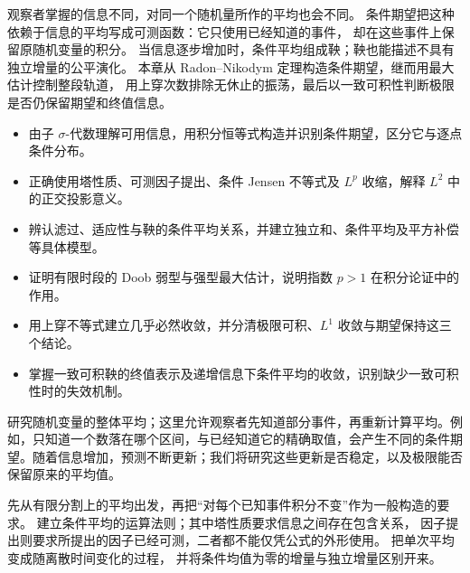 
\begin{chapterabstract}
观察者掌握的信息不同，对同一个随机量所作的平均也会不同。
条件期望把这种依赖于信息的平均写成可测函数：它只使用已经知道的事件，
却在这些事件上保留原随机变量的积分。
当信息逐步增加时，条件平均组成鞅；鞅也能描述不具有独立增量的公平演化。
本章从 Radon--Nikodym 定理构造条件期望，继而用最大估计控制整段轨道，
用上穿次数排除无休止的振荡，最后以一致可积性判断极限是否仍保留期望和终值信息。
\end{chapterabstract}

\begin{learninggoals}
\begin{itemize}
\item\label{b1:item:31-goal-construction}由子 \(\sigma\)-代数理解可用信息，用积分恒等式构造并识别条件期望，区分它与逐点条件分布。
\item\label{b1:item:31-goal-calculus}正确使用塔性质、可测因子提出、条件 Jensen 不等式及 \(L^p\) 收缩，解释 \(L^2\) 中的正交投影意义。
\item\label{b1:item:31-goal-models}辨认滤过、适应性与鞅的条件平均关系，并建立独立和、条件平均及平方补偿等具体模型。
\item\label{b1:item:31-goal-maximal}证明有限时段的 Doob 弱型与强型最大估计，说明指数 \(p>1\) 在积分论证中的作用。
\item\label{b1:item:31-goal-convergence}用上穿不等式建立几乎必然收敛，并分清极限可积、\(L^1\) 收敛与期望保持这三个结论。
\item\label{b1:item:31-goal-terminal}掌握一致可积鞅的终值表示及递增信息下条件平均的收敛，识别缺少一致可积性时的失效机制。
\end{itemize}
\end{learninggoals}

研究随机变量的整体平均；这里允许观察者先知道部分事件，再重新计算平均。例如，只知道一个数落在哪个区间，与已经知道它的精确取值，会产生不同的条件期望。随着信息增加，预测不断更新；我们将研究这些更新是否稳定，以及极限能否保留原来的平均值。

\ProseParagraphBreak

先从有限分割上的平均出发，再把“对每个已知事件积分不变”作为一般构造的要求。
建立条件平均的运算法则；其中塔性质要求信息之间存在包含关系，
因子提出则要求所提出的因子已经可测，二者都不能仅凭公式的外形使用。
把单次平均变成随离散时间变化的过程，
并将条件均值为零的增量与独立增量区别开来。

